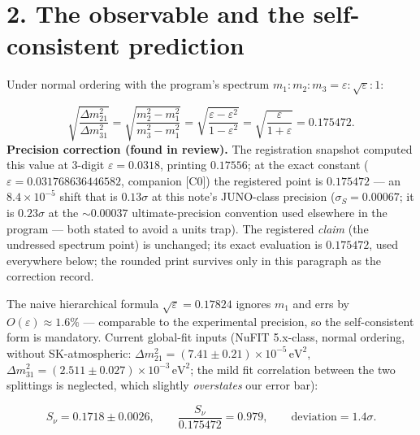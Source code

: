\documentclass[11pt]{article}
\begin{document}
\section*{2. The observable and the self-consistent prediction}
Under normal ordering with the program's spectrum $m_1 : m_2 : m_3 = \varepsilon : \sqrt\varepsilon : 1$:

\[
\sqrt{\frac{\Delta m^2_{21}}{\Delta m^2_{31}}}
= \sqrt{\frac{m_2^2 - m_1^2}{m_3^2 - m_1^2}}
= \sqrt{\frac{\varepsilon - \varepsilon^2}{1 - \varepsilon^2}}
= \sqrt{\frac{\varepsilon}{1+\varepsilon}}
= 0.175472 .
\]
\textbf{Precision correction (found in review).}  The registration snapshot computed this value at 3-digit $\varepsilon = 0.0318$, printing $0.17556$; at the exact constant ($\varepsilon = 0.031768636446582$, companion [C0]) the registered point is $\mathbf{0.175472}$ — an $8.4\times 10^{-5}$ shift that is $0.13\sigma$ at this note's JUNO-class precision ($\sigma_S = 0.00067$; it is $0.23\sigma$ at the $\sim 0.00037$ ultimate-precision convention used elsewhere in the program — both stated to avoid a units trap).  The registered \emph{claim} (the undressed spectrum point) is unchanged; its exact evaluation is $0.175472$, used everywhere below; the rounded print survives only in this paragraph as the correction record.

The naive hierarchical formula $\sqrt\varepsilon = 0.17824$ ignores $m_1$ and errs by $O(\varepsilon) \approx 1.6\%$ — comparable to the experimental precision, so the self-consistent form is mandatory. Current global-fit inputs (NuFIT 5.x-class, normal ordering, without SK-atmospheric: $\Delta m^2_{21} = (7.41 \pm 0.21)\times 10^{-5}\,\mathrm{eV}^2$, $\Delta m^2_{31} = (2.511 \pm 0.027)\times 10^{-3}\,\mathrm{eV}^2$; the mild fit correlation between the two splittings is neglected, which slightly \emph{overstates} our error bar):

\[
S_\nu = 0.1718 \pm 0.0026, \qquad
\frac{S_\nu}{0.175472} = 0.979, \qquad
\text{deviation} = 1.4\sigma .
\]
\end{document}
